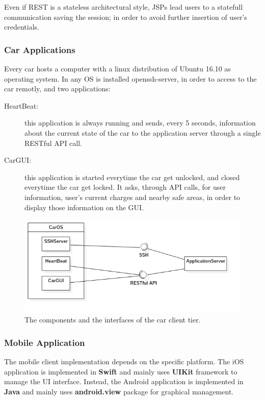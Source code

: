 Even if REST is a stateless architectural style, JSPs lead users to a statefull communication saving the session; in order to avoid further insertion of user's credentials.

\subsubsection{Car Applications}

Every car hosts a computer with a linux distribution of Ubuntu 16.10 as operating system. In any OS is installed openssh-server, in order to access to the car remotly, and two applications:
\begin{description}
	\item[HeartBeat:] this application is always running and sends, every 5 seconds, information about the current state of the car to the application server through a single RESTful API call.
	\item[CarGUI:] this application is started everytime the car get unlocked, and closed everytime the car get locked. It asks, through API calls, for user information, user's current charges and nearby safe areas, in order to display those information on the GUI.
\end{description}

\begin{figure}[H]
	\centering
	\includegraphics[width=\textwidth, keepaspectratio]{diagrams/CarClientComponents.png}
	\caption{The components and the interfaces of the car client tier.}
	\label {fig:car-client-components}
\end{figure}

\subsubsection{Mobile Application}

The mobile client implementation depends on the specific platform. 
The iOS application is implemented in \textbf{Swift} and mainly uses \textbf{UIKit} framework to manage the UI interface.
Instead, the Android application is implemented in \textbf{Java} and mainly uses \textbf{android.view} package for graphical management.

